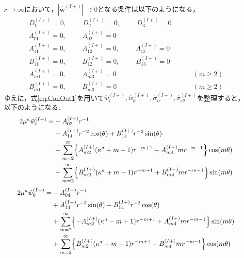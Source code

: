 $r\rightarrow\infty$において，$|\hat{\bm{w}}^{(I+)}|\rightarrow0$となる条件は以下のようになる，
\begin{align}
D_{1}^{(I+)}=0,\hspace{1cm}
D_{2}^{(I+)}=0,\hspace{1cm}
D_{3}^{(I+)}=0&
\nonumber
\\
A_{01}^{(I+)}=0,\hspace{1cm}A_{02}^{(I+)}=0&
\nonumber
\\
A_{11}^{(I+)}=0,\hspace{1cm}A_{12}^{(I+)}=0,\hspace{1cm}A_{13}^{(I+)}=0&
\nonumber
\\
B_{11}^{(I+)}=0,\hspace{1cm}B_{12}^{(I+)}=0,\hspace{1cm}B_{13}^{(I+)}=0&
\nonumber
\\
A_{m1}^{(I+)}=0,\hspace{1cm}A_{m3}^{(I+)}=0&\hspace{1cm}(m\geq2)
\nonumber
\\
B_{m1}^{(I+)}=0,\hspace{1cm}B_{m3}^{(I+)}=0&\hspace{1cm}(m\geq2)
\label{eq:ConOut1}
\end{align}
ゆえに，式\eqref{eq:ConOut1}を用いて$\hat{w}_{r}^{(I+)},\hat{w}_{\theta}^{(I+)},\hat{\sigma}_{rr}^{(I+)},\hat{\sigma}_{r\theta}^{(I+)}$を整理すると，以下のようになる．
\begin{align}
	2\mu^{a}\hat{w}_{r}^{(I+)} =&-A_{03}^{(I+)}r^{-1}
	\nonumber
	\\
	&+A_{14}^{(I+)}r^{-2}\cos(\theta)
	+B_{14}^{(I+)}r^{-2}\sin(\theta)
	\nonumber
	\\
	&+\sum_{m=2}^{\infty}\Bigl\{A_{m2}^{(I+)}(\kappa^{a}+m-1)r^{-m+1}
	+A_{m4}^{(I+)}mr^{-m-1}\Bigr\}\cos(m\theta)
	\nonumber
	\\
	&+\sum_{m=2}^{\infty}\Bigl\{B_{m2}^{(I+)}(\kappa^{a}+m-1)r^{-m+1}
	+B_{m4}^{(I+)}mr^{-m-1}\Bigr\}\sin(m\theta)
	\label{eq:UROut1}
\end{align}
\begin{align}
	2\mu^{a}\hat{w}_{\theta}^{(I+)} =&-A_{04}^{(I+)}r^{-1}
	\nonumber
	\\
	&+A_{14}^{(I+)}r^{-2}\sin(\theta)
	-B_{14}^{(I+)}r^{-2}\cos(\theta)
	\nonumber
	\\
	&+\sum_{m=2}^{\infty}\Bigl\{-A_{m2}^{(I+)}(\kappa^{a}-m+1)r^{-m+1}
	+A_{m4}^{(I+)}mr^{-m-1}\Bigr\}\sin(m\theta)
	\nonumber
	\\
	&+\sum_{m=2}^{\infty}\Bigl\{B_{m2}^{(I+)}(\kappa^{a}-m+1)r^{-m+1}
	-B_{m4}^{(I+)}mr^{-m-1}\Bigr\}\cos(m\theta)
	\label{eq:UThOut1}
\end{align}
